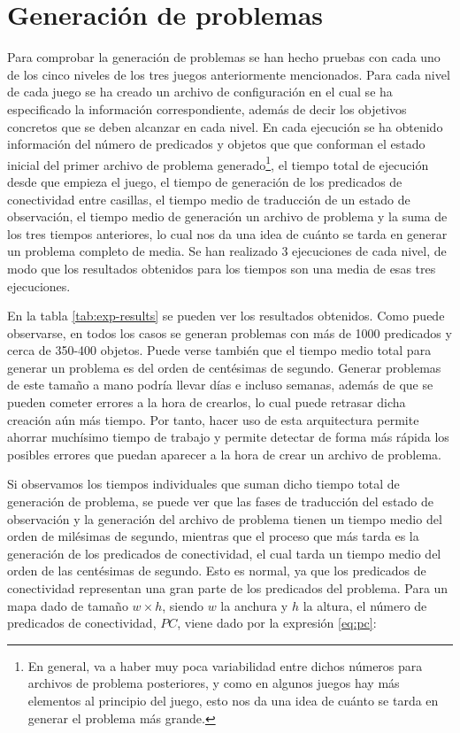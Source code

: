 \section{Generación de problemas}

Para comprobar la generación de problemas se han hecho pruebas con cada uno de los cinco
niveles de los tres juegos anteriormente mencionados. Para cada nivel de cada juego se ha
creado un archivo de configuración en el cual se ha especificado la información correspondiente,
además de decir los objetivos concretos que se deben alcanzar en cada nivel. En cada ejecución se
ha obtenido información del número de predicados y objetos que que conforman el estado inicial
del primer archivo de problema generado\footnote{En general, va a haber muy poca variabilidad entre
dichos números para archivos de problema posteriores, y como en algunos juegos hay más
elementos al principio del juego, esto nos da una idea de cuánto se tarda en generar el problema más
grande.}, el tiempo total de ejecución desde que empieza el juego, el tiempo de generación
de los predicados de conectividad entre casillas, el tiempo medio de traducción de
un estado de observación, el tiempo medio de generación un archivo de problema
y la suma de los tres tiempos anteriores, lo cual nos da una idea de cuánto se tarda en
generar un problema completo de media. Se han realizado 3 ejecuciones de cada nivel, de modo
que los resultados obtenidos para los tiempos son una media de esas tres ejecuciones.

En la tabla \ref{tab:exp-results} se pueden ver los resultados obtenidos. Como puede observarse,
en todos los casos se generan problemas con más de 1000 predicados y cerca de 350-400 objetos.
Puede verse también que el tiempo medio total para generar un problema es del orden de centésimas
de segundo. Generar problemas de este tamaño a mano podría llevar días e incluso semanas, además de
que se pueden cometer errores a la hora de crearlos, lo cual puede retrasar dicha creación aún
más tiempo. Por tanto, hacer uso de esta arquitectura permite ahorrar muchísimo tiempo de trabajo
y permite detectar de forma más rápida los posibles errores que puedan aparecer a la hora de crear
un archivo de problema.

Si observamos los tiempos individuales que suman dicho tiempo total de generación de problema, se
puede ver que las fases de traducción del estado de observación y la generación del archivo
de problema tienen un tiempo medio del orden de milésimas de segundo, mientras que el proceso
que más tarda es la generación de los predicados de conectividad, el cual tarda un tiempo medio
del orden de las centésimas de segundo. Esto es normal, ya que los predicados de conectividad representan
una gran parte de los predicados del problema. Para un mapa dado de tamaño $w \times h$, siendo $w$
la anchura y $h$ la altura, el número de predicados de conectividad, $PC$, viene dado por la expresión
\eqref{eq:pc}:

